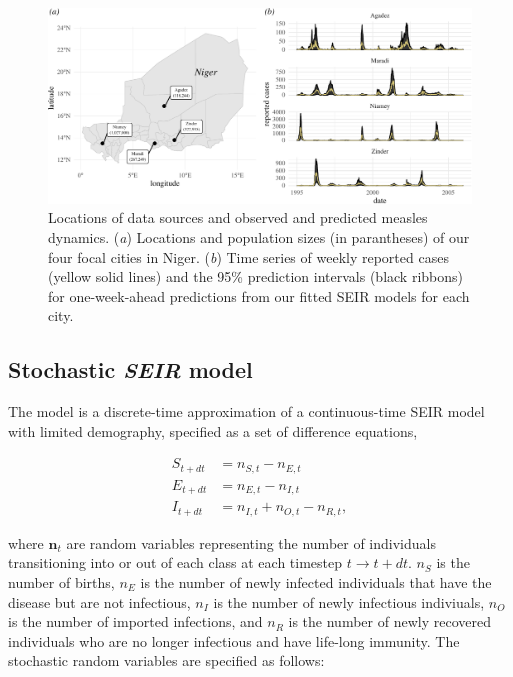 \documentclass[3p]{elsarticle} %
\makeatletter
\def\maxwidth{\ifdim\Gin@nat@width>\linewidth\linewidth
\else\Gin@nat@width\fi}
\let\Oldincludegraphics\includegraphics
\renewcommand{\includegraphics}[1]{\Oldincludegraphics[width=\maxwidth]{#1}}
\makeatother
\begin{document}
\begin{figure}
\centering
\includegraphics{measles-ews-manuscript_files/figure-latex/data-plot-1.pdf}
\caption{Locations of data sources and observed and predicted measles
dynamics. (\emph{a}) Locations and population sizes (in parantheses) of
our four focal cities in Niger. (\emph{b}) Time series of weekly
reported cases (yellow solid lines) and the 95\% prediction intervals
(black ribbons) for one-week-ahead predictions from our fitted SEIR
models for each city. \label{data-plot}}
\end{figure}

\hypertarget{stochastic-seir-model}{%
\subsection{\texorpdfstring{Stochastic \emph{SEIR}
model}{Stochastic SEIR model}}\label{stochastic-seir-model}}

The model is a discrete-time approximation of a continuous-time SEIR
model with limited demography, specified as a set of difference
equations,

\begin{align}
S_{t+dt} &= n_{S,t} - n_{E,t} \\
E_{t+dt} &= n_{E,t} - n_{I,t} \\
I_{t+dt} &= n_{I,t} + n_{O,t} - n_{R,t},
\end{align}

\noindent{}where \(\textbf{n}_t\) are random variables representing the
number of individuals transitioning into or out of each class at each
timestep \(t \rightarrow t+dt\). \(n_{S}\) is the number of births,
\(n_{E}\) is the number of newly infected individuals that have the
disease but are not infectious, \(n_{I}\) is the number of newly
infectious indiviuals, \(n_{O}\) is the number of imported infections,
and \(n_{R}\) is the number of newly recovered individuals who are no
longer infectious and have life-long immunity. The stochastic random
variables are specified as follows:
\end{document}

